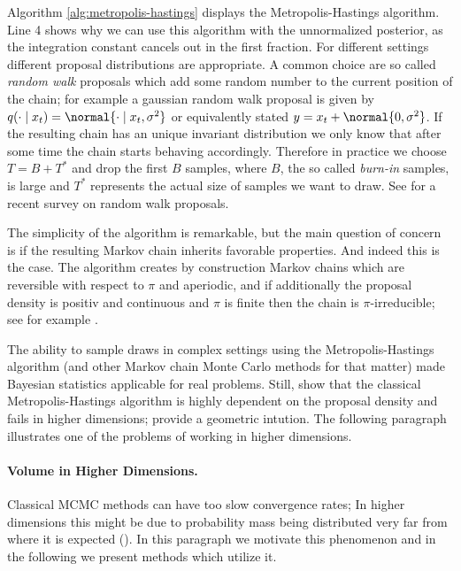 \noindent
Algorithm \ref{alg:metropolis-hastings} displays the Metropolis-Hastings algorithm.
Line 4 shows why we can use this algorithm with the unnormalized posterior, as the integration constant cancels out in the first fraction.
For different settings different proposal distributions are appropriate.
A common choice are so called \emph{random walk} proposals which add some random number to the current position of the chain; for example a gaussian random walk proposal is given by $q(\cdot \mid x_t) = \normal{\cdot \mid x_t, \sigma^2}$ or equivalently stated $y = x_t + \normal{0, \sigma^2}$.
If the resulting chain has an unique invariant distribution we only know that after some time the chain starts behaving accordingly.
Therefore in practice we choose $T = B + T^*$ and drop the first $B$ samples, where $B$, the so called \emph{burn-in} samples, is large and $T^*$ represents the actual size of samples we want to draw.
See \citet{sherlock2010} for a recent survey on random walk proposals.

The simplicity of the algorithm is remarkable, but the main question of concern is if the resulting Markov chain inherits favorable properties.
And indeed this is the case.
The algorithm creates by construction Markov chains which are reversible with respect to $\pi$ and aperiodic, and if additionally the proposal density is positiv and continuous and $\pi$ is finite then the chain is $\pi$-irreducible; see for example \citet{roberts2004}.

The ability to sample draws in complex settings using the Metropolis-Hastings algorithm (and other Markov chain Monte Carlo methods for that matter) made Bayesian statistics applicable for real problems.
Still, \citet{Au2001EstimationOS} show that the classical Metropolis-Hastings algorithm is highly dependent on the proposal density and fails in higher dimensions; \citet{zuev08} provide a geometric intution.
The following paragraph illustrates one of the problems of working in higher dimensions.

\paragraph{Volume in Higher Dimensions.}
Classical MCMC methods can have too slow convergence rates; In higher dimensions this might be due to probability mass being distributed very far from where it is expected (\citet{betancourt2017convergence}).
In this paragraph we motivate this phenomenon and in the following we present methods which utilize it.


